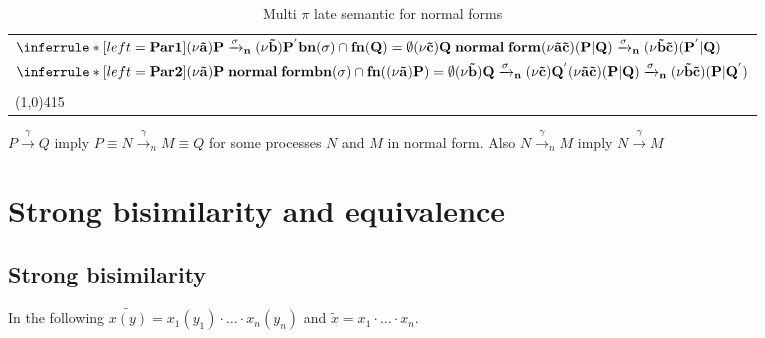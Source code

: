 \begin{definition}
\begin{table}
\begin{tabular}{l}
      \\
	  $\inferrule* [left=\bf{Par1}]{
	      (\nu \tilde{a}) P \xrightarrow{\sigma}_{n} (\nu \tilde{b})P^{'}
	    \\
	      bn(\sigma)\cap fn(Q)=\emptyset
	    \\
	      (\nu \tilde{c})Q\; normal\; form
	  }{
	    (\nu \tilde{a} \tilde{c})(P|Q) \xrightarrow{\sigma}_{n} (\nu \tilde{b} \tilde{c})(P^{'}|Q)
	  }$
      \\
	  $\inferrule* [left=\bf{Par2}]{
	      (\nu \tilde{a})P\; normal\; form
	    \\
	      bn(\sigma)\cap fn((\nu \tilde{a})P)=\emptyset
	    \\
	      (\nu \tilde{b}) Q \xrightarrow{\sigma}_{n} (\nu \tilde{c})Q^{'}
	  }{
	    (\nu \tilde{a} \tilde{c})(P|Q) \xrightarrow{\sigma}_{n} (\nu \tilde{b} \tilde{c})(P|Q^{'})
	  }$
	\\\\\multicolumn{1}{l}{\line(1,0){415}}
    \end{tabular}
    \caption{Multi $\pi$ late semantic for normal forms}
    \label{multipiInpNorm}
  \end{table}
\end{definition}

\begin{lemma}\label{moveCongDownNorm2}
  $P\xrightarrow{\gamma}Q$ imply $P\equiv N \xrightarrow{\gamma}_{n} M\equiv Q$ for some processes $N$ and $M$ in normal form. Also $N \xrightarrow{\gamma}_{n} M$ imply $N \xrightarrow{\gamma} M$
\end{lemma}



\section{Strong bisimilarity and equivalence}

\subsection{Strong bisimilarity}

In the following $\widetilde{x(y)}=x_{1}(y_{1}) \cdot \ldots \cdot x_{n}(y_{n})$ and $\tilde{x}= x_{1}\cdot \ldots \cdot x_{n}$.

